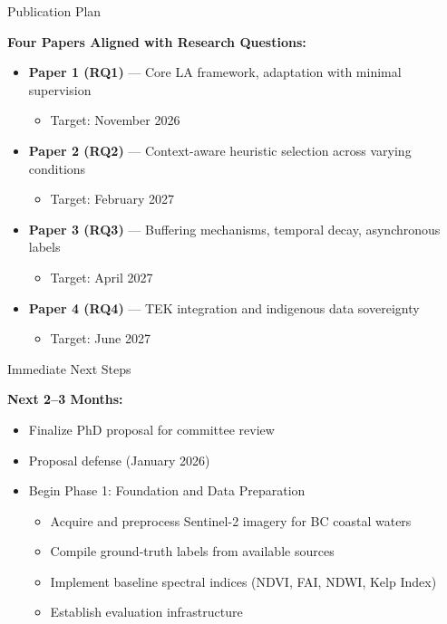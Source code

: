 \documentclass[10pt,xcolor={table,dvipsnames},t]{beamer}
\begin{document}
\begin{frame}{Publication Plan}

\textbf{Four Papers Aligned with Research Questions:}

\vspace{0.5em}
\begin{itemize}
  \item \textbf{Paper 1 (RQ1)} --- Core LA framework, adaptation with minimal supervision
  \begin{itemize}
    \item Target: November 2026
  \end{itemize}

  \item \textbf{Paper 2 (RQ2)} --- Context-aware heuristic selection across varying conditions
  \begin{itemize}
    \item Target: February 2027
  \end{itemize}

  \item \textbf{Paper 3 (RQ3)} --- Buffering mechanisms, temporal decay, asynchronous labels
  \begin{itemize}
    \item Target: April 2027
  \end{itemize}

  \item \textbf{Paper 4 (RQ4)} --- TEK integration and indigenous data sovereignty
  \begin{itemize}
    \item Target: June 2027
  \end{itemize}
\end{itemize}

\end{frame}

\begin{frame}{Immediate Next Steps}

\textbf{Next 2--3 Months:}
\begin{itemize}
  \item Finalize PhD proposal for committee review
  \item Proposal defense (January 2026)
  \item Begin Phase 1: Foundation and Data Preparation
  \begin{itemize}
    \item Acquire and preprocess Sentinel-2 imagery for BC coastal waters
    \item Compile ground-truth labels from available sources
    \item Implement baseline spectral indices (NDVI, FAI, NDWI, Kelp Index)
    \item Establish evaluation infrastructure
  \end{itemize}
\end{itemize}

\end{frame}
\end{document}
